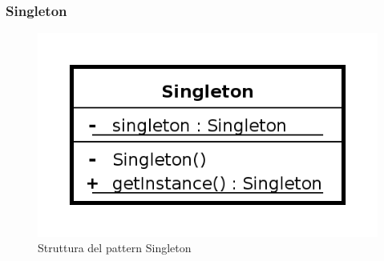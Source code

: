 	\subsubsection{Singleton}
		\begin{figure}[!h]
			\centering
			\includegraphics[scale=0.4]{img/singleton}  
			\caption{Struttura del pattern Singleton}
		\end{figure}
		
